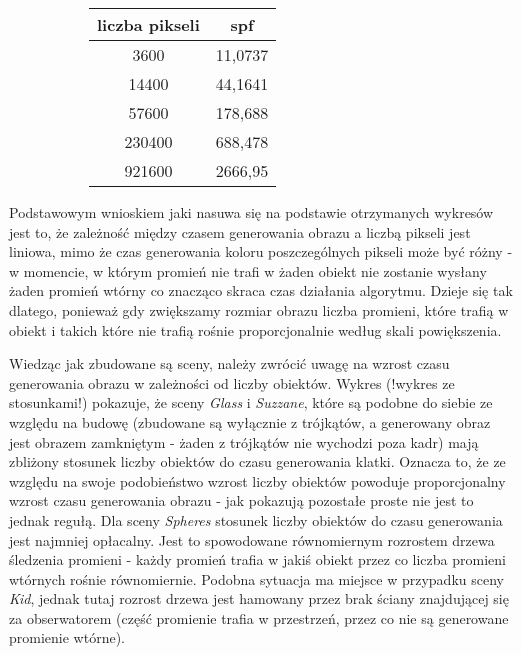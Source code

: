 \begin{figure}[!ht]
\advance\leftskip-2cm
\begin{subfigure}{.5\textwidth}
\end{subfigure}
\hspace{2cm}
\begin{subfigure}{.5\textwidth}
		\begin{longtable}{|c|c|} \hline
	    liczba pikseli & spf \\ \hline
	    3600 & 11,0737 \\ 
	    14400 & 44,1641 \\
		57600 & 178,688 \\
		230400 & 688,478 \\
		921600 & 2666,95 \\
		\hline
		\end{longtable}
\end{subfigure}
\end{figure}

Podstawowym wnioskiem jaki nasuwa się na podstawie otrzymanych wykresów jest to, że zależność między czasem generowania obrazu a liczbą pikseli jest liniowa, mimo że czas generowania koloru poszczególnych pikseli może być różny - w momencie, w którym promień nie trafi w żaden obiekt nie zostanie wysłany żaden promień wtórny co znacząco skraca czas działania algorytmu. Dzieje się tak dlatego, ponieważ gdy zwiększamy rozmiar obrazu liczba promieni, które trafią w obiekt i takich które nie trafią rośnie proporcjonalnie według skali powiększenia.

Wiedząc jak zbudowane są sceny, należy zwrócić uwagę na wzrost czasu generowania obrazu w zależności od liczby obiektów. Wykres (!wykres ze stosunkami!) pokazuje, że sceny \emph{Glass} i \emph{Suzzane}, które są podobne do siebie ze względu na budowę (zbudowane są wyłącznie z trójkątów, a generowany obraz jest obrazem zamkniętym - żaden z trójkątów nie wychodzi poza kadr) mają zbliżony stosunek liczby obiektów do czasu generowania klatki. Oznacza to, że ze względu na swoje podobieństwo wzrost liczby obiektów powoduje proporcjonalny wzrost czasu generowania obrazu - jak pokazują pozostałe proste nie jest to jednak regułą. Dla sceny \emph{Spheres} stosunek liczby obiektów do czasu generowania jest najmniej opłacalny. Jest to spowodowane równomiernym rozrostem drzewa śledzenia promieni - każdy promień trafia w jakiś obiekt przez co liczba promieni wtórnych rośnie równomiernie. Podobna sytuacja ma miejsce w przypadku sceny \emph{Kid}, jednak tutaj rozrost drzewa jest hamowany przez brak ściany znajdującej się za obserwatorem (część promienie trafia w przestrzeń, przez co nie są generowane promienie wtórne).

